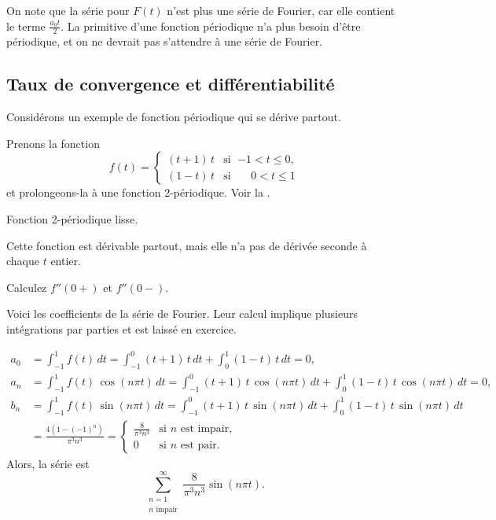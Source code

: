 On note que la série pour $F(t)$ n'est plus une série de Fourier, car elle contient le terme $\frac{a_0 t}{2}$. La primitive d'une fonction périodique n'a plus besoin d'être périodique, et on ne devrait pas s'attendre à une série de Fourier.

\subsection{Taux de convergence et différentiabilité}

Considérons un exemple de fonction périodique qui se dérive partout.

\begin{example}
Prenons la fonction
\begin{equation*}
f(t) =
\begin{cases}
(t+1)\,t & \text{si } \; {-1} < t \leq 0 , \\
(1-t)\,t & \text{si } \; \phantom{-}0 < t \leq 1
\end{cases}
\end{equation*}
et prolongeons-la à une fonction 2-périodique. Voir la .

\begin{myfig}
\capstart
{}
\caption{Fonction 2-périodique lisse.\label{gfs:smoothexfig}}
\end{myfig}

Cette fonction est dérivable partout, mais elle
n'a pas de dérivée seconde à chaque $t$ entier.

\begin{exercise}
Calculez  $f''(0+)$ et $f''(0-)$.
\end{exercise}

Voici les coefficients de la série de Fourier.  Leur calcul 
implique plusieurs intégrations par parties et est laissé en exercice.

\begin{align*}
a_0 & = 
\int_{-1}^1
f(t) \, dt = 
\int_{-1}^0
(t+1)\,t \, dt +
\int_0^1
(1-t)\,t \, dt = 0 , \\
a_n & = 
\int_{-1}^1
f(t) \, \cos (n\pi t) \, dt = 
\int_{-1}^0
(t+1)\,t
\, \cos (n \pi t) \, dt +
\int_0^1
(1-t)\,t
\, \cos (n \pi t) \, dt = 0, \\
b_n & = 
\int_{-1}^1
f(t) \, \sin (n\pi t) \, dt = 
\int_{-1}^0
(t+1)\,t
\, \sin (n \pi t) \, dt +
\int_0^1
(1-t)\,t
\, \sin (n \pi t) \, dt \\
& =
\frac{4 ( 1-{(-1)}^n)}{\pi^3 n^3} 
=
\begin{cases}
\frac{8}{\pi^3 n^3} & \text{si } n \text{ est impair} , \\
0 & \text{si } n \text{ est pair} .
\end{cases}
\end{align*}
Alors, la série est 
\begin{equation*}
\sum_{\substack{n=1 \\ n \text{ impair}}}^\infty \frac{8}{\pi^3 n^3} \sin (n \pi t) .
\end{equation*}


\end{example}

